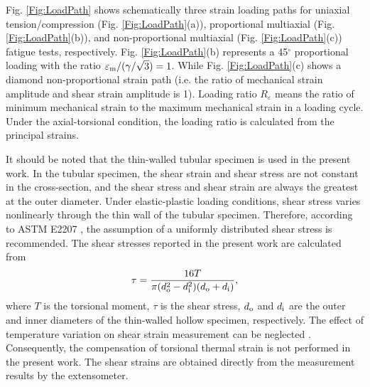 \documentclass[preprint,5p,twocolumn,11pt,sort&compress]{elsarticle}
\begin{document}
Fig. \ref{Fig:LoadPath} shows schematically three strain loading paths for uniaxial tension/compression (Fig. \ref{Fig:LoadPath}(a)), proportional multiaxial (Fig. \ref{Fig:LoadPath}(b)), and non-proportional multiaxial (Fig. \ref{Fig:LoadPath}(c)) fatigue tests, respectively. Fig. \ref{Fig:LoadPath}(b) represents a 45$^\circ$ proportional loading with the ratio $\varepsilon_{\rm m}/(\gamma/\sqrt{3})=1$. While Fig. \ref{Fig:LoadPath}(c) shows a diamond non-proportional strain path (i.e. the ratio of mechanical strain amplitude and shear strain amplitude is 1). Loading ratio $R_\varepsilon$ means the ratio of minimum mechanical strain to the maximum mechanical strain in a loading cycle. Under the axial-torsional condition, the loading ratio is calculated from the principal strains. 

It should be noted that the thin-walled tubular specimen is used in the present work. In the tubular specimen, the shear strain and shear stress are not constant in the cross-section, and the shear stress and shear strain are always the greatest at the outer diameter. Under elastic-plastic loading conditions, shear stress varies nonlinearly through the thin wall of the tubular specimen. Therefore, according to ASTM E2207 \cite{ASTM2014}, the assumption of a uniformly distributed shear stress is recommended. The shear stresses reported in the present work are calculated from
\begin{equation}
\tau=\frac{16T}{\pi(d_{\rm o}^2-d_{\rm i}^2)(d_{\rm o}+d_{\rm i})},
\end{equation}
where $T$ is the torsional moment, $\tau$ is the shear stress, $d_{\rm o}$ and $d_{\rm i}$ are the outer and inner diameters of the thin-walled hollow specimen, respectively. The effect of temperature variation on shear strain measurement can be neglected \cite{Bakis2014}. Consequently, the compensation of torsional thermal strain is not performed in the present work. The shear strains are obtained directly from the measurement results by the extensometer.

\end{document}
